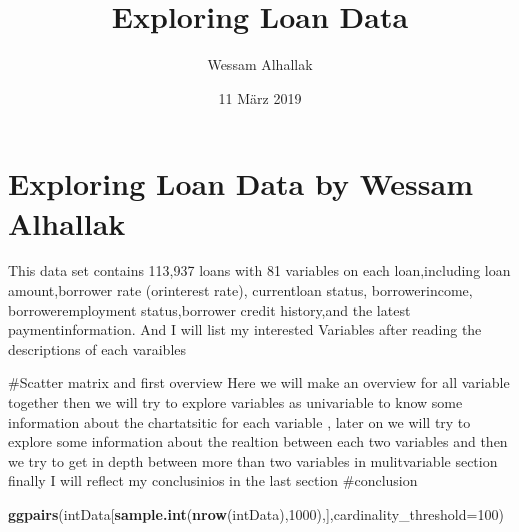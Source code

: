 \documentclass[]{article}
\title{Exploring Loan Data}
\author{Wessam Alhallak}
\date{11 März 2019}
\newenvironment{Shaded}{\begin{snugshade}}{\end{snugshade}}
\newcommand{\DataTypeTok}[1]{\textcolor[rgb]{0.13,0.29,0.53}{#1}}
\newcommand{\DecValTok}[1]{\textcolor[rgb]{0.00,0.00,0.81}{#1}}
\newcommand{\KeywordTok}[1]{\textcolor[rgb]{0.13,0.29,0.53}{\textbf{#1}}}
\newcommand{\NormalTok}[1]{#1}
\newcommand{\OperatorTok}[1]{\textcolor[rgb]{0.81,0.36,0.00}{\textbf{#1}}}
\begin{document}
\maketitle

\hypertarget{exploring-loan-data-by-wessam-alhallak}{%
\section{Exploring Loan Data by Wessam
Alhallak}\label{exploring-loan-data-by-wessam-alhallak}}

This data set contains 113,937 loans with 81 variables on each
loan,including loan amount,borrower rate (orinterest rate), currentloan
status, borrowerincome, borroweremployment status,borrower credit
history,and the latest paymentinformation. And I will list my interested
Variables after reading the descriptions of each varaibles

\begin{Shaded}
\end{Shaded}

\#Scatter matrix and first overview Here we will make an overview for
all variable together then we will try to explore variables as
univariable to know some information about the chartatsitic for each
variable , later on we will try to explore some information about the
realtion between each two variables and then we try to get in depth
between more than two variables in mulitvariable section finally I will
reflect my conclusinios in the last section \#conclusion

\begin{Shaded}
\begin{Highlighting}[]
\KeywordTok{ggpairs}\NormalTok{(intData[}\KeywordTok{sample.int}\NormalTok{(}\KeywordTok{nrow}\NormalTok{(intData),}\DecValTok{1000}\NormalTok{),],}\DataTypeTok{cardinality_threshold=}\DecValTok{100}\NormalTok{)}
\end{Highlighting}
\end{Shaded}
\end{document}
